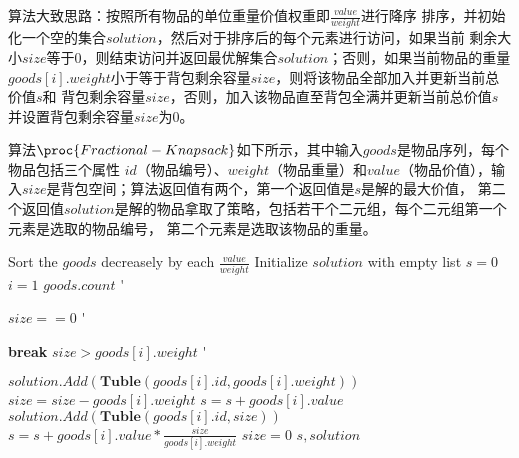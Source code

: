 \begin{solution}
    算法大致思路：按照所有物品的单位重量价值权重即$\frac{value}{weight}$进行降序
    排序，并初始化一个空的集合$solution$，然后对于排序后的每个元素进行访问，如果当前
    剩余大小$size$等于0，则结束访问并返回最优解集合$solution$；否则，如果当前物品的重量
    $goods[i].weight$小于等于背包剩余容量$size$，则将该物品全部加入并更新当前总价值$s$和
    背包剩余容量$size$，否则，加入该物品直至背包全满并更新当前总价值$s$并设置背包剩余容量$size$为0。
    
    算法$\proc{Fractional-Knapsack}$如下所示，其中输入$goods$是物品序列，每个物品包括三个属性
    $id$（物品编号）、$weight$（物品重量）和$value$（物品价值），输入$size$是背包空间；算法返回值有两个，第一个返回值是$s$是解的最大价值，
    第二个返回值$solution$是解的物品拿取了策略，包括若干个二元组，每个二元组第一个元素是选取的物品编号，
    第二个元素是选取该物品的重量。
    \newcommand{\Doo}{\>\textbf{}\hspace*{-0.7em}\'\addtocounter{indent}{1}}
            \begin{codebox}
                \li Sort the $goods$ decreasely by each $\frac{value}{weight}$
                \li Initialize $solution$ with empty list
                \li $s = 0$
                \li \For $i = 1$ \To $goods.count$ \Doo
                \li     \If $size == 0$ \Doo
                \li         \textbf{break}\End
                \li         \If $size>goods[i].weight$ \Doo
                \li             $solution.Add(\textbf{Tuble}(goods[i].id,goods[i].weight))$
                \li             $size = size - goods[i].weight$
                \li             $s = s + goods[i].value$
                \li         \Else
                \li             $solution.Add(\textbf{Tuble}(goods[i].id,size))$
                \li             $s = s + goods[i].value * \frac{size}{goods[i].weight}$
                \li             $size = 0$ \End \End 
                \li \Return $s,solution$
            \end{codebox}
\end{solution}